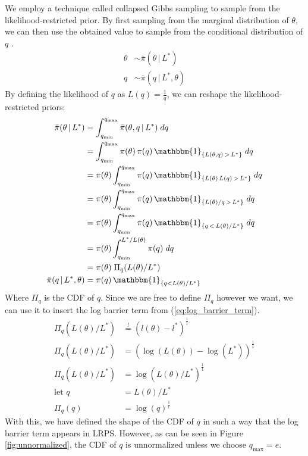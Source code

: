 \documentclass[12pt, a4paper]{report}
\begin{document}
We employ a technique called collapsed Gibbs sampling to sample from the likelihood-restricted prior.
By first sampling from the marginal distribution of $\theta$, we can then use the obtained value to sample from the conditional distribution of $q$ \cite{collapsed_gibbs}.
\begin{align*}
    \theta &\sim  \bar{\pi}(\theta \,|\, L^*) \\
    q &\sim  \bar{\pi}(q \,|\, L^*, \theta)
\end{align*}
By defining the likelihood of $q$ as $L(q) = \frac{1}{q}$, we can reshape the likelihood-restricted priors:
\begin{align*}
    \bar{\pi}(\theta \,|\, L^*) &= \int_{q_{\textrm{min}}}^{q_{\textrm{max}}} \bar{\pi}(\theta, q \,|\, L^*) \; dq \\
    &= \int_{q_{\textrm{min}}}^{q_{\textrm{max}}} \pi(\theta) \, \pi(q) \, \mathbbm{1}_{\{L(\theta, q) \,>\, L^*\}} \; dq \\
    &= \pi(\theta) \int_{q_{\textrm{min}}}^{q_{\textrm{max}}} \pi(q) \, \mathbbm{1}_{\{L(\theta) \, L(q) \,>\, L^*\}} \; dq \\
    &= \pi(\theta) \int_{q_{\textrm{min}}}^{q_{\textrm{max}}} \pi(q) \, \mathbbm{1}_{\{L(\theta) / q \,>\, L^*\}} \; dq \\
    &= \pi(\theta) \int_{q_{\textrm{min}}}^{q_{\textrm{max}}} \pi(q) \, \mathbbm{1}_{\{q \,<\, L(\theta) / L^*\}} \; dq \\
    &= \pi(\theta) \int_{q_{\textrm{min}}}^{L^* / L(\theta)} \pi(q) \; dq \\
    &= \pi(\theta) \; \Pi_q(L(\theta) / L^*) \\
    \bar{\pi}(q \,|\, L^*, \theta) &= \pi(q) \, \mathbbm{1}_{\{q < L(\theta) / L^*\}}
\end{align*}
Where $\Pi_q$ is the CDF of $q$.
Since we are free to define $\Pi_q$ however we want, we can use it to insert the log barrier term from (\ref{eq:log_barrier_term}).
\begin{align*}
    \Pi_q(L(\theta) / L^*) &\overset{!}{=} (l(\theta) - l^*)^{\frac{1}{t}} \\
    \Pi_q(L(\theta) / L^*) &=(\log(L(\theta)) - \log(L^*))^{\frac{1}{t}} \\
    \Pi_q(L(\theta) / L^*) &= \log(L(\theta) / L^*)^{\frac{1}{t}} \\
    \textrm{let } q &= L(\theta) / L^* \\
    \Pi_q(q) &= \log(q)^{\frac{1}{t}}
\end{align*}
With this, we have defined the shape of the CDF of $q$ in such a way that the log barrier term appears in LRPS.
However, as can be seen in Figure \ref{fig:unnormalized}, the CDF of $q$ is unnormalized unless we choose $q_{\textrm{max}}=e$.
\end{document}
